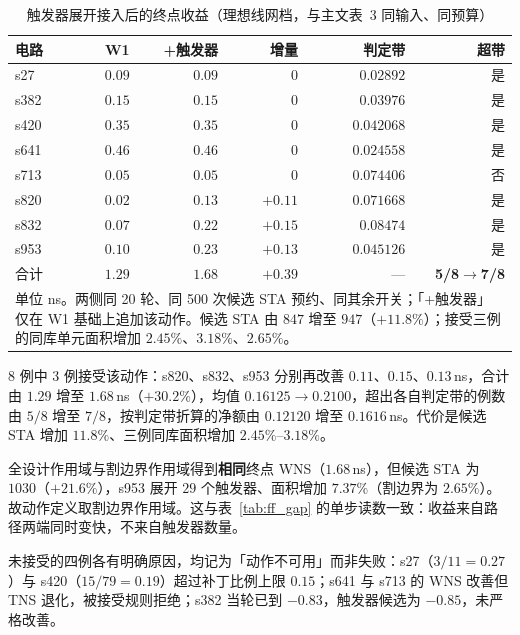 \documentclass[twocolumn,10pt,fontset=windows]{ctexart}
\begin{document}
\begin{table}[H]
\centering
\caption{触发器展开接入后的终点收益（理想线网档，与主文表~3 同输入、同预算）}
\label{tab:ff_integrated}
\footnotesize
\setlength{\tabcolsep}{4pt}
\begin{tabular}{lrrrrr}
\toprule
\textbf{电路} & \textbf{W1} & \textbf{+触发器} & \textbf{增量} & \textbf{判定带} & \textbf{超带} \\
\midrule
s27  & $0.09$ & $0.09$ & $0$      & $0.02892$  & 是 \\
s382 & $0.15$ & $0.15$ & $0$      & $0.03976$  & 是 \\
s420 & $0.35$ & $0.35$ & $0$      & $0.042068$ & 是 \\
s641 & $0.46$ & $0.46$ & $0$      & $0.024558$ & 是 \\
s713 & $0.05$ & $0.05$ & $0$      & $0.074406$ & 否 \\
s820 & $0.02$ & $0.13$ & $+0.11$  & $0.071668$ & 是 \\
s832 & $0.07$ & $0.22$ & $+0.15$  & $0.08474$  & 是 \\
s953 & $0.10$ & $0.23$ & $+0.13$  & $0.045126$ & 是 \\
\midrule
合计 & $1.29$ & $\mathbf{1.68}$ & $\mathbf{+0.39}$ & — & \textbf{5/8}$\to$\textbf{7/8} \\
\bottomrule
\multicolumn{6}{p{0.94\columnwidth}}{\footnotesize 单位 ns。两侧同 20 轮、同 500 次候选 STA 预约、同其余开关；「+触发器」仅在 W1 基础上追加该动作。候选 STA 由 $847$ 增至 $947$（$+11.8\%$）；接受三例的同库单元面积增加 $2.45\%$、$3.18\%$、$2.65\%$。}\\
\end{tabular}
\end{table}

8 例中 3 例接受该动作：s820、s832、s953 分别再改善 $0.11$、$0.15$、$0.13$\,ns，合计由 $1.29$ 增至 $1.68$\,ns（$+30.2\%$），均值 $0.16125\to0.2100$，超出各自判定带的例数由 $5/8$ 增至 $7/8$，按判定带折算的净额由 $0.12120$ 增至 $0.1616$\,ns。代价是候选 STA 增加 $11.8\%$、三例同库面积增加 $2.45\%$--$3.18\%$。

全设计作用域与割边界作用域得到\textbf{相同}终点 WNS（$1.68$\,ns），但候选 STA 为 $1030$（$+21.6\%$），s953 展开 $29$ 个触发器、面积增加 $7.37\%$（割边界为 $2.65\%$）。故动作定义取割边界作用域。这与表~\ref{tab:ff_gap} 的单步读数一致：收益来自路径两端同时变快，不来自触发器数量。

未接受的四例各有明确原因，均记为「动作不可用」而非失败：s27（$3/11=0.27$）与 s420（$15/79=0.19$）超过补丁比例上限 $0.15$；s641 与 s713 的 WNS 改善但 TNS 退化，被接受规则拒绝；s382 当轮已到 $-0.83$，触发器候选为 $-0.85$，未严格改善。
\end{document}

